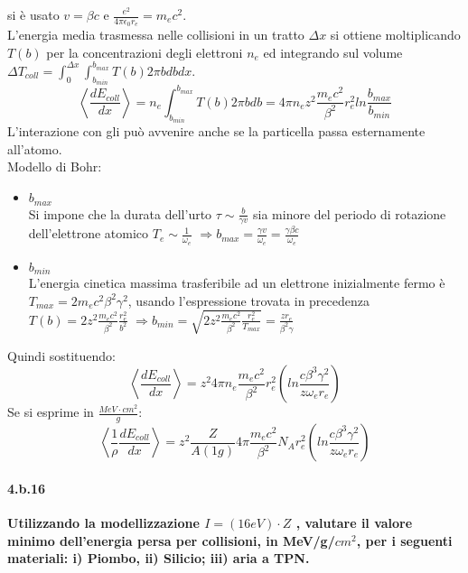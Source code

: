 \documentclass[twoside]{article}
\begin{document}
si è usato $v=\beta c$ e $\frac{e^2}{4 \pi \epsilon_0 r_e}= m_e c^2$.\\
L'energia media trasmessa nelle collisioni in un tratto $\Delta x$ si ottiene moltiplicando $T(b)$ per la concentrazioni degli elettroni $n_e$ ed integrando sul volume $\Delta T_{coll}=\int_0^{\Delta x} \int_{b_{min}}^{b_{max}} T(b) 2 \pi b db dx$.\\
\begin{equation*}
    \left<\frac{dE_{coll}}{dx} \right>=n_e \int_{b_{min}}^{b_{max}} T(b) 2 \pi b db = 4 \pi n_e z^2 \frac{m_e c^2}{\beta^2}r_e^2 ln\frac{b_{max}}{b_{min}} 
\end{equation*}
\warning L'interazione con gli può avvenire anche se la particella passa esternamente all'atomo.\\
Modello di Bohr:\\
\begin{itemize}
    \item $b_{max}$\\
    Si impone che la durata dell'urto $\tau \sim \frac{b}{\gamma v} $ sia minore del periodo di rotazione dell'elettrone atomico $T_e\sim \frac{1}{\omega_e}$ $\Rightarrow b_{max}=\frac{\gamma v}{\omega_e}=\frac{\gamma \beta c}{\omega_e}$ 
    \item $b_{min}$\\
    L'energia cinetica massima trasferibile ad un elettrone inizialmente fermo è $T_{max}=2 m_e c^2 \beta^2 \gamma^2$, usando l'espressione trovata in precedenza $ T(b)=2z^2 \frac{m_e c^2}{\beta^2}\frac{r_e^2}{b^2}$ $\Rightarrow b_{min}=\sqrt{2z^2 \frac{m_e c^2}{\beta^2}\frac{r_e^2}{T_{max}}}=\frac{z r_e}{\beta^2 \gamma}$
\end{itemize}
Quindi sostituendo:
\begin{equation*}
      \left<\frac{dE_{coll}}{dx}\right>= z^2 4\pi n_e \frac{m_e c^2}{\beta^2}r_e^2\left(ln\frac{c\beta^3\gamma^2}{z\omega_e r_e} \right)  
\end{equation*}
Se si esprime in $\frac{MeV \cdot cm^2}{g}$:
\begin{equation}
  \left<\frac{1}{\rho}\frac{dE_{coll}}{dx}\right>= z^2\frac{Z}{A (1 g)} 4\pi \frac{m_e c^2}{\beta^2}N_A r_e^2\left(ln\frac{c\beta^3\gamma^2}{z\omega_e r_e} \right)  
\end{equation}
\paragraph{4.b.16}\textbf{Utilizzando la modellizzazione $I = (16eV)\cdot Z$ , valutare il valore minimo dell’energia persa per collisioni, in MeV/g/$cm^2$, per i seguenti materiali: i) Piombo, ii) Silicio; iii) aria a TPN.} \\ \\
\end{document}
